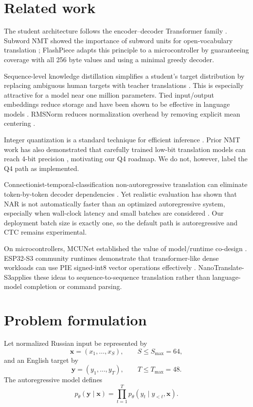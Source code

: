 \documentclass{article}
\newcommand{\modelname}{NanoTranslate-S3}
\begin{document}
\section{Related work}
The student architecture follows the encoder--decoder Transformer family \citep{vaswani2017attention}. Subword NMT showed the importance of subword units for open-vocabulary translation \citep{sennrich2016subword}; FlashPiece adapts this principle to a microcontroller by guaranteeing coverage with all 256 byte values and using a minimal greedy decoder.

Sequence-level knowledge distillation simplifies a student's target distribution by replacing ambiguous human targets with teacher translations \citep{kim2016sequence}. This is especially attractive for a model near one million parameters. Tied input/output embeddings reduce storage and have been shown to be effective in language models \citep{press2017using}. RMSNorm reduces normalization overhead by removing explicit mean centering \citep{zhang2019rmsnorm}.

Integer quantization is a standard technique for efficient inference \citep{jacob2018quantization}. Prior NMT work has also demonstrated that carefully trained low-bit translation models can reach 4-bit precision \citep{aji2019fourbit}, motivating our Q4 roadmap. We do not, however, label the Q4 path as implemented.

Connectionist-temporal-classification non-autoregressive translation can eliminate token-by-token decoder dependencies \citep{libovicky2018ctc}. Yet realistic evaluation has shown that NAR is not automatically faster than an optimized autoregressive system, especially when wall-clock latency and small batches are considered \citep{helcl2022nar}. Our deployment batch size is exactly one, so the default path is autoregressive and CTC remains experimental.

On microcontrollers, MCUNet established the value of model/runtime co-design \citep{lin2020mcunet}. ESP32-S3 community runtimes demonstrate that transformer-like dense workloads can use PIE signed-int8 vector operations effectively \citep{dory2026esp32llm,bareiro2026commands}. \modelname applies these ideas to sequence-to-sequence translation rather than language-model completion or command parsing.

\section{Problem formulation}
Let normalized Russian input be represented by
\begin{equation}
\mathbf{x}=(x_1,\dots,x_S),\qquad S\le S_{\max}=64,
\end{equation}
and an English target by
\begin{equation}
\mathbf{y}=(y_1,\dots,y_T),\qquad T\le T_{\max}=48.
\end{equation}
The autoregressive model defines
\begin{equation}
p_\theta(\mathbf{y}\mid\mathbf{x})
=\prod_{t=1}^{T}p_\theta(y_t\mid y_{<t},\mathbf{x}).
\end{equation}
\end{document}
